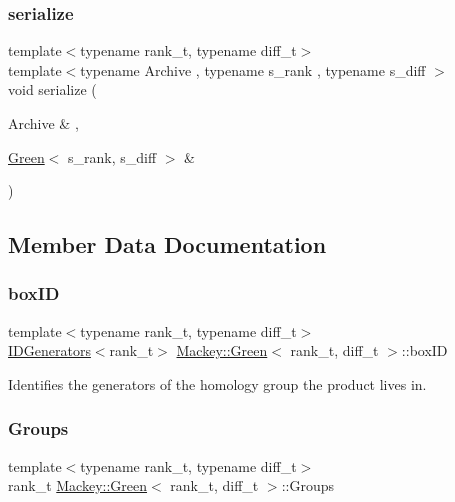 \subsubsection{\texorpdfstring{serialize}{serialize}}
{\footnotesize\ttfamily template$<$typename rank\+\_\+t, typename diff\+\_\+t$>$ \\
template$<$typename Archive , typename s\+\_\+rank , typename s\+\_\+diff $>$ \\
void serialize (\begin{DoxyParamCaption}\item[{Archive \&}]{,  }\item[{\hyperlink{classMackey_1_1Green}{Green}$<$ s\+\_\+rank, s\+\_\+diff $>$ \&}]{ }\end{DoxyParamCaption})\hspace{0.3cm}{\ttfamily [friend]}}



\subsection{Member Data Documentation}
\mbox{\label{classMackey_1_1Green_aea166896ebdaa17b3c5d21b2ae936e0d}} 
\subsubsection{\texorpdfstring{box\+ID}{boxID}}
{\footnotesize\ttfamily template$<$typename rank\+\_\+t, typename diff\+\_\+t$>$ \\
\hyperlink{classMackey_1_1IDGenerators}{I\+D\+Generators}$<$rank\+\_\+t$>$ \hyperlink{classMackey_1_1Green}{Mackey\+::\+Green}$<$ rank\+\_\+t, diff\+\_\+t $>$\+::box\+ID}



Identifies the generators of the homology group the product lives in. 

\mbox{\label{classMackey_1_1Green_acfa5ea708949024bd24f1c1e21399cbc}} 
\subsubsection{\texorpdfstring{Groups}{Groups}}
{\footnotesize\ttfamily template$<$typename rank\+\_\+t, typename diff\+\_\+t$>$ \\
rank\+\_\+t \hyperlink{classMackey_1_1Green}{Mackey\+::\+Green}$<$ rank\+\_\+t, diff\+\_\+t $>$\+::Groups}



